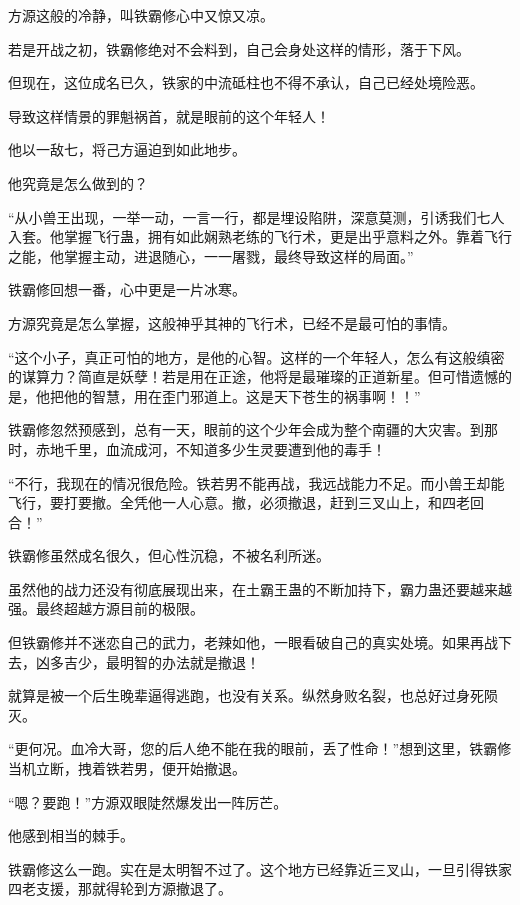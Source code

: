 
\begin{this_body}

方源这般的冷静，叫铁霸修心中又惊又凉。

若是开战之初，铁霸修绝对不会料到，自己会身处这样的情形，落于下风。

但现在，这位成名已久，铁家的中流砥柱也不得不承认，自己已经处境险恶。

导致这样情景的罪魁祸首，就是眼前的这个年轻人！

他以一敌七，将己方逼迫到如此地步。

他究竟是怎么做到的？

“从小兽王出现，一举一动，一言一行，都是埋设陷阱，深意莫测，引诱我们七人入套。他掌握飞行蛊，拥有如此娴熟老练的飞行术，更是出乎意料之外。靠着飞行之能，他掌握主动，进退随心，一一屠戮，最终导致这样的局面。”

铁霸修回想一番，心中更是一片冰寒。

方源究竟是怎么掌握，这般神乎其神的飞行术，已经不是最可怕的事情。

“这个小子，真正可怕的地方，是他的心智。这样的一个年轻人，怎么有这般缜密的谋算力？简直是妖孽！若是用在正途，他将是最璀璨的正道新星。但可惜遗憾的是，他把他的智慧，用在歪门邪道上。这是天下苍生的祸事啊！！”

铁霸修忽然预感到，总有一天，眼前的这个少年会成为整个南疆的大灾害。到那时，赤地千里，血流成河，不知道多少生灵要遭到他的毒手！

“不行，我现在的情况很危险。铁若男不能再战，我远战能力不足。而小兽王却能飞行，要打要撤。全凭他一人心意。撤，必须撤退，赶到三叉山上，和四老回合！”

铁霸修虽然成名很久，但心性沉稳，不被名利所迷。

虽然他的战力还没有彻底展现出来，在土霸王蛊的不断加持下，霸力蛊还要越来越强。最终超越方源目前的极限。

但铁霸修并不迷恋自己的武力，老辣如他，一眼看破自己的真实处境。如果再战下去，凶多吉少，最明智的办法就是撤退！

就算是被一个后生晚辈逼得逃跑，也没有关系。纵然身败名裂，也总好过身死陨灭。

“更何况。血冷大哥，您的后人绝不能在我的眼前，丢了性命！”想到这里，铁霸修当机立断，拽着铁若男，便开始撤退。

“嗯？要跑！”方源双眼陡然爆发出一阵厉芒。

他感到相当的棘手。

铁霸修这么一跑。实在是太明智不过了。这个地方已经靠近三叉山，一旦引得铁家四老支援，那就得轮到方源撤退了。


\end{this_body}
